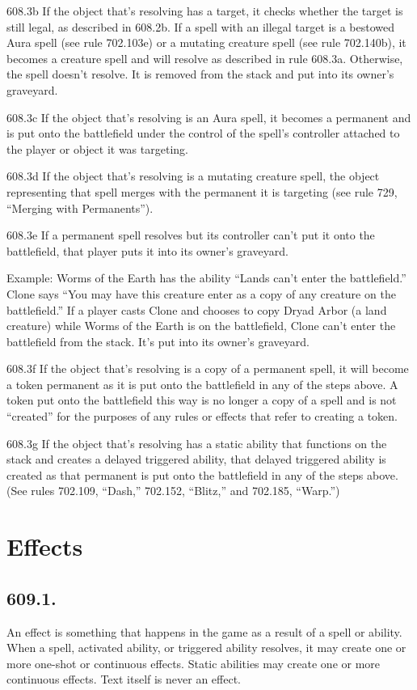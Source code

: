 608.3b If the object that’s resolving has a target, it checks whether the target is still legal, as described in 608.2b. If a spell with an illegal target is a bestowed Aura spell (see rule 702.103e) or a mutating creature spell (see rule 702.140b), it becomes a creature spell and will resolve as described in rule 608.3a. Otherwise, the spell doesn’t resolve. It is removed from the stack and put into its owner’s graveyard.

608.3c If the object that’s resolving is an Aura spell, it becomes a permanent and is put onto the battlefield under the control of the spell’s controller attached to the player or object it was targeting.

608.3d If the object that’s resolving is a mutating creature spell, the object representing that spell merges with the permanent it is targeting (see rule 729, “Merging with Permanents”).

608.3e If a permanent spell resolves but its controller can’t put it onto the battlefield, that player puts it into its owner’s graveyard.

Example: Worms of the Earth has the ability “Lands can’t enter the battlefield.” Clone says “You may have this creature enter as a copy of any creature on the battlefield.” If a player casts Clone and chooses to copy Dryad Arbor (a land creature) while Worms of the Earth is on the battlefield, Clone can’t enter the battlefield from the stack. It’s put into its owner’s graveyard.

608.3f If the object that’s resolving is a copy of a permanent spell, it will become a token permanent as it is put onto the battlefield in any of the steps above. A token put onto the battlefield this way is no longer a copy of a spell and is not “created” for the purposes of any rules or effects that refer to creating a token.

608.3g If the object that’s resolving has a static ability that functions on the stack and creates a delayed triggered ability, that delayed triggered ability is created as that permanent is put onto the battlefield in any of the steps above. (See rules 702.109, “Dash,” 702.152, “Blitz,” and 702.185, “Warp.”)

\section{Effects}
\subsection*{609.1.}
An effect is something that happens in the game as a result of a spell or ability. When a spell, activated ability, or triggered ability resolves, it may create one or more one-shot or continuous effects. Static abilities may create one or more continuous effects. Text itself is never an effect.

